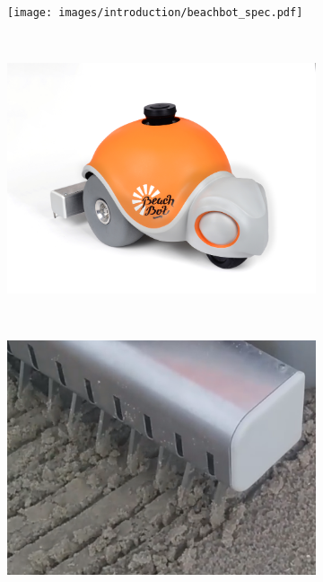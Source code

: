 \begin{figure}
\centering
\begin{subfigure}[c]{1\textwidth}
\texttt{[image: images/introduction/beachbot\_spec.pdf]} 
\end{subfigure}
\\
\begin{subfigure}[c]{0.46\textwidth}
\includegraphics[width=\textwidth]{images/introduction/final_shell.jpg} 
\end{subfigure}
\\
\vspace{2cm}
\begin{subfigure}[c]{0.46\textwidth}
\includegraphics[width=\textwidth]{images/introduction/localization_precision.png} 

\end{subfigure}
\end{figure}
